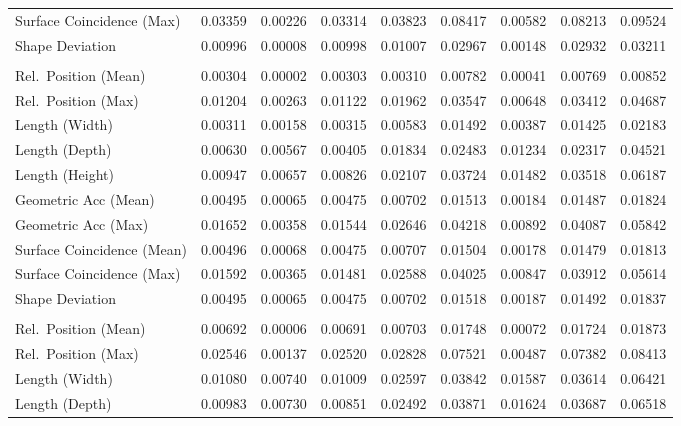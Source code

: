 \documentclass{ieeeaccess}
\begin{document}
\begin{table}[t]
\begin{tabular}{
      >{\raggedright\arraybackslash}p{3.0cm}
      S S S S
      S S S S
  }
    Surface Coincidence (Max) & 0.03359 & 0.00226 & 0.03314 & 0.03823  & 0.08417 & 0.00582 & 0.08213 & 0.09524 \\
    Shape Deviation           & 0.00996 & 0.00008 & 0.00998 & 0.01007  & 0.02967 & 0.00148 & 0.02932 & 0.03211 \\
    \midrule
     \\
    Rel.\ Position (Mean)    & 0.00304 & 0.00002 & 0.00303 & 0.00310  & 0.00782 & 0.00041 & 0.00769 & 0.00852 \\
    Rel.\ Position (Max)     & 0.01204 & 0.00263 & 0.01122 & 0.01962  & 0.03547 & 0.00648 & 0.03412 & 0.04687 \\
    Length (Width)            & 0.00311 & 0.00158 & 0.00315 & 0.00583  & 0.01492 & 0.00387 & 0.01425 & 0.02183 \\
    Length (Depth)            & 0.00630 & 0.00567 & 0.00405 & 0.01834  & 0.02483 & 0.01234 & 0.02317 & 0.04521 \\
    Length (Height)           & 0.00947 & 0.00657 & 0.00826 & 0.02107  & 0.03724 & 0.01482 & 0.03518 & 0.06187 \\
    Geometric Acc (Mean)      & 0.00495 & 0.00065 & 0.00475 & 0.00702  & 0.01513 & 0.00184 & 0.01487 & 0.01824 \\
    Geometric Acc (Max)       & 0.01652 & 0.00358 & 0.01544 & 0.02646  & 0.04218 & 0.00892 & 0.04087 & 0.05842 \\
    Surface Coincidence (Mean)& 0.00496 & 0.00068 & 0.00475 & 0.00707  & 0.01504 & 0.00178 & 0.01479 & 0.01813 \\
    Surface Coincidence (Max) & 0.01592 & 0.00365 & 0.01481 & 0.02588  & 0.04025 & 0.00847 & 0.03912 & 0.05614 \\
    Shape Deviation           & 0.00495 & 0.00065 & 0.00475 & 0.00702  & 0.01518 & 0.00187 & 0.01492 & 0.01837 \\
    \midrule
     \\
    Rel.\ Position (Mean)    & 0.00692 & 0.00006 & 0.00691 & 0.00703  & 0.01748 & 0.00072 & 0.01724 & 0.01873 \\
    Rel.\ Position (Max)     & 0.02546 & 0.00137 & 0.02520 & 0.02828  & 0.07521 & 0.00487 & 0.07382 & 0.08413 \\
    Length (Width)            & 0.01080 & 0.00740 & 0.01009 & 0.02597  & 0.03842 & 0.01587 & 0.03614 & 0.06421 \\
    Length (Depth)            & 0.00983 & 0.00730 & 0.00851 & 0.02492  & 0.03871 & 0.01624 & 0.03687 & 0.06518 \\

\end{tabular}
\end{table}
\end{document}
